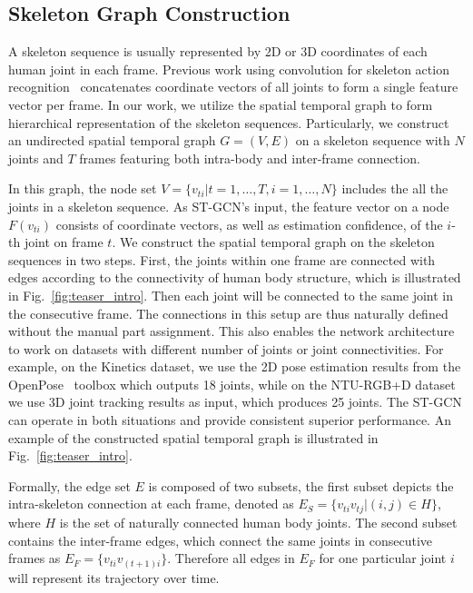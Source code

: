 \documentclass[letterpaper]{article} %
\begin{document}
\subsection{Skeleton Graph Construction}
\label{sec:graph_construction}
A skeleton sequence is usually represented by 2D or 3D coordinates of each human joint in each frame. Previous work using convolution for skeleton action recognition~\cite{Kim2017CVPRW} concatenates coordinate vectors of all joints to form a single feature vector per frame.
In our work, we utilize the spatial temporal graph to form hierarchical representation of the skeleton sequences. 
Particularly, we construct an undirected spatial temporal graph $ G = (V, E) $ on a skeleton sequence with $ N $ joints and $ T $ frames featuring both intra-body and inter-frame connection.

In this graph, the node set $ V = \{v_{ti} | t = 1,\ldots, T, i=1,\ldots,N\} $ includes the all the joints in a skeleton sequence. 
As ST-GCN's input, the feature vector on a node $F(v_{ti})$ consists of coordinate vectors, as well as estimation confidence, of the $i$-th joint on frame $t$.
%
We construct the spatial temporal graph on the skeleton sequences in two steps. 
First, the joints within one frame are connected with edges according to the connectivity of human body structure, which is illustrated in Fig.~\ref{fig:teaser_intro}. 
Then each joint will be connected to the same joint in the consecutive frame.
The connections in this setup are thus naturally defined without the manual part assignment. 
This also enables the network architecture to work on datasets with different number of joints or joint connectivities.
For example, on the Kinetics dataset, we use the 2D pose estimation results from the OpenPose~\cite{Cao2017Openpose} toolbox which outputs 18 joints, while on the NTU-RGB+D dataset~\cite{Shahroudy2016CVPR} we use 3D joint tracking results as input, which produces 25 joints.
The ST-GCN can operate in both situations and provide consistent superior performance.
An example of the constructed spatial temporal graph is illustrated in Fig.~\ref{fig:teaser_intro}.

Formally,
the edge set $ E $ is composed of two subsets, the first subset depicts the intra-skeleton connection at each frame, denoted as
$	
E_S = \{v_{ti}v_{tj}| (i, j) \in H\} 
$,
where $ H $ is the set of naturally connected human body joints.
The second subset contains the inter-frame edges, which connect the same joints in consecutive frames as
$
	E_F = \{v_{ti}v_{(t+1) i}\}
$. 
Therefore all edges in $ E_F $ for one particular joint $ i $ will represent its trajectory over time.
\end{document}
